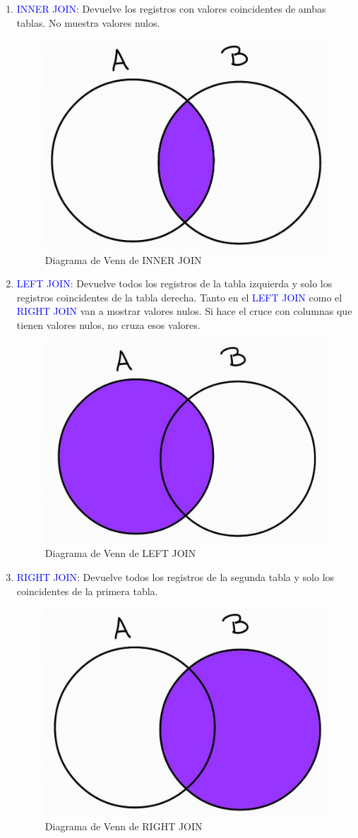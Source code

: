 \documentclass[a4paper, 12pt]{book}
\begin{document}
\begin{enumerate}
\item \textcolor{blue}{INNER JOIN}: Devuelve los registros con valores coincidentes de ambas tablas. No muestra valores nulos.
\begin{figure}[H] 
\centering 
\includegraphics[width=0.4\linewidth]{innerjoin.jpg}
\caption{Diagrama de Venn de INNER JOIN}
\end{figure}
\item \textcolor{blue}{LEFT JOIN}: Devuelve todos los registros de la tabla izquierda y solo los registros coincidentes de la tabla derecha. Tanto en el \textcolor{blue}{LEFT JOIN} como el \textcolor{blue}{RIGHT JOIN} van a mostrar valores nulos. Si hace el cruce con columnas que tienen valores nulos, no cruza esos valores.
\begin{figure}[H] 
\centering 
\includegraphics[width=0.4\linewidth]{leftjoin.jpg}
\caption{Diagrama de Venn de LEFT JOIN}
\end{figure}
\item \textcolor{blue}{RIGHT JOIN}: Devuelve todos los registros de la segunda tabla y solo los coincidentes de la primera tabla.
\begin{figure}[H] 
\centering 
\includegraphics[width=0.4\linewidth]{rightjoin.jpg}
\caption{Diagrama de Venn de RIGHT JOIN}
\end{figure}

\end{enumerate}
\end{document}
